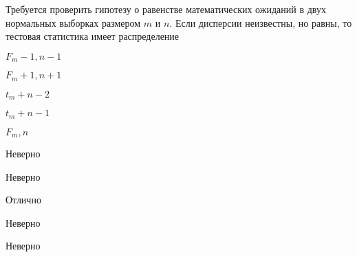 
\begin{question}
Требуется проверить гипотезу о равенстве математических ожиданий в двух
нормальных выборках размером \(m\) и \(n\). Если дисперсии неизвестны,
но равны, то тестовая статистика имеет распределение
\begin{answerlist}
  \item \(F_m-1,n-1\)
  \item \(F_m+1,n+1\)
  \item \(t_m+n-2\)
  \item \(t_m+n-1\)
  \item \(F_m,n\)
\end{answerlist}
\end{question}

\begin{solution}
\begin{answerlist}
  \item Неверно
  \item Неверно
  \item Отлично
  \item Неверно
  \item Неверно
\end{answerlist}
\end{solution}

